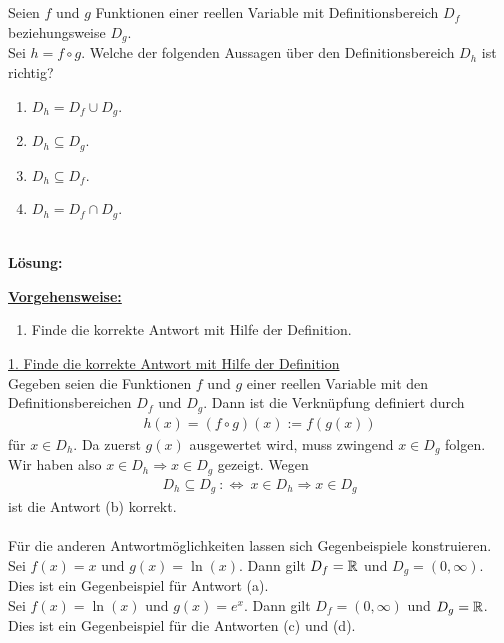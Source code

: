  \newpage

\subsection*{}
Seien $ f $ und $ g $ Funktionen einer reellen Variable mit Definitionsbereich $ D_f $ beziehungsweise $ D_g $.\\
Sei $ h = f \circ g $.
Welche der folgenden Aussagen über den Definitionsbereich $ D_h $ ist richtig?
\renewcommand{\labelenumi}{(\alph{enumi})}
\begin{enumerate}
	\item 
	$ D_h = D_f \cup D_g$.
	\item 
	$ D_h \subseteq D_g $.
	\item
	$ D_h \subseteq D_f $.
	\item
	$ D_h = D_f \cap  D_g $.
\end{enumerate}
\ \\
\textbf{Lösung:}
\begin{mdframed}
\underline{\textbf{Vorgehensweise:}}
\renewcommand{\labelenumi}{\theenumi.}
\begin{enumerate}
\item Finde die korrekte Antwort mit Hilfe der Definition. 

\end{enumerate}
\end{mdframed}

\underline{1. Finde die korrekte Antwort mit Hilfe der Definition}\\
Gegeben seien die Funktionen $ f $ und $ g $ einer reellen Variable mit den Definitionsbereichen $ D_f $ und $ D_g $.
Dann ist die Verknüpfung definiert durch
\begin{align*}
	h(x) = (f \circ g)(x):= f(g(x))
\end{align*}
für $ x \in D_h $. Da zuerst $ g(x) $ ausgewertet wird, muss zwingend $ x \in D_g $ folgen. Wir haben also $ x \in D_h \Rightarrow x \in D_g $ gezeigt.
Wegen
\begin{align*}
	D_h \subseteq D_g
	\ :\Leftrightarrow \
	x \in D_h \Rightarrow x \in D_g
\end{align*}
ist die Antwort (b) korrekt.\\
\\
Für die anderen Antwortmöglichkeiten lassen sich Gegenbeispiele konstruieren.\\
Sei $ f(x)  =  x $ und $ g(x) = \ln(x) $. Dann gilt $ D_f = \mathbb{R} $ und $ D_g = (0, \infty)$.
Dies ist ein Gegenbeispiel für Antwort (a).\\
Sei $ f(x) = \ln(x) $ und $ g(x ) = e^x $. Dann gilt $ D_f = (0, \infty) $ und $ D_g = \mathbb{R} $. Dies ist ein Gegenbeispiel für die Antworten (c) und (d). 
\newpage
